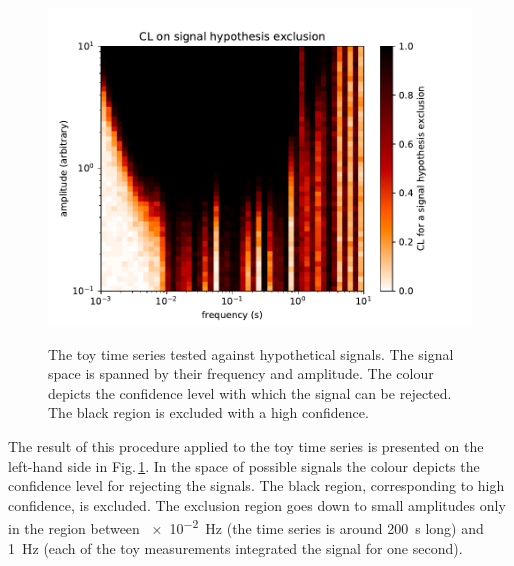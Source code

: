 \begin{figure}
  \centering
  \subfloat[The test without the use of the CLs method.]
  {\label{fig:axions_exclusion_noCLs}
  \includegraphics[width=.5\linewidth]{gfx/axions/basic_exclusion_noCls.pdf}}
  \caption{The toy time series tested against hypothetical signals. The signal space is spanned by their frequency and amplitude. The colour depicts the confidence level with which the signal can be rejected. The black region is excluded with a high confidence. }\label{fig:axions_exclusions}
\end{figure}

The result of this procedure applied to the toy time series is presented on the left-hand side in Fig.\,\ref{fig:axions_exclusions}. In the space of possible signals the colour depicts the confidence level for rejecting the signals. The black region, corresponding to high confidence, is excluded. The exclusion region goes down to small amplitudes only in the region between \SI{e-2}{\hertz} (the time series is around \SI{200}{\second} long) and \SI{1}{\hertz} (each of the toy measurements integrated the signal for one second).


